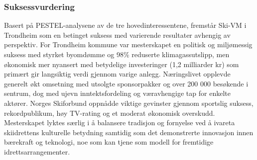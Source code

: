\subsubsection{Suksessvurdering}
Basert på PESTEL-analysene av de tre hovedinteressentene, fremstår Ski-VM i Trondheim som en betinget suksess med varierende resultater avhengig av perspektiv. For Trondheim kommune var mesterskapet en politisk og miljømessig suksess med styrket byomdømme og 98\% reduserte klimagassutslipp\parencite{Trondheim2025Kutt}, men økonomisk mer nyansert med betydelige investeringer (1,2 milliarder kr) som primært gir langsiktig verdi gjennom varige anlegg. Næringslivet opplevde generelt økt omsetning med utsolgte sponsorpakker og over 200 000 besøkende i sentrum\parencite{wikipediaSkiVM}, dog med ujevn inntektsfordeling og væravhengige tap for enkelte aktører\parencite{innherredTragedie}. Norges Skiforbund oppnådde viktige gevinster gjennom sportslig suksess, rekordpublikum, høy TV-rating og et moderat økonomisk overskudd\parencite{Adresseavisen}. Mesterskapet lyktes særlig i å balansere tradisjon og fornyelse ved å ivareta skiidrettens kulturelle betydning samtidig som det demonstrerte innovasjon innen bærekraft og teknologi, noe som kan tjene som modell for fremtidige idrettsarrangementer.
